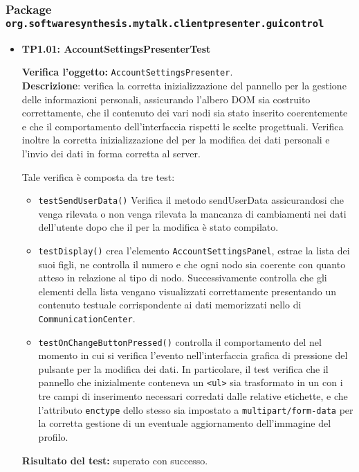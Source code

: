 \subsubsection{Package \texttt{org.softwaresynthesis.mytalk.clientpresenter.guicontrol}}

\begin{itemize}
\item \textbf{TP1.01: AccountSettingsPresenterTest}

\textbf{Verifica l'oggetto:} \texttt{AccountSettingsPresenter}.\\
\textbf{Descrizione}: verifica la corretta inizializzazione del pannello per la gestione delle informazioni personali, assicurando l'albero DOM sia costruito correttamente, che il contenuto dei vari nodi sia stato inserito coerentemente e che il comportamento dell'interfaccia rispetti le scelte progettuali. Verifica inoltre la corretta inizializzazione del  per la modifica dei dati personali e l'invio dei dati in forma corretta al server.

Tale verifica è composta da tre test:
\begin{itemize}

\item \texttt{testSendUserData()} Verifica il metodo sendUserData assicurandosi che venga rilevata o non venga rilevata la mancanza di cambiamenti nei dati dell'utente dopo che il  per la modifica è stato compilato.

\item \texttt{testDisplay()} crea l'elemento \texttt{AccountSettingsPanel}, estrae la lista dei suoi figli, ne controlla il numero e che ogni nodo sia coerente con quanto atteso in relazione al tipo di nodo.
Successivamente controlla che gli elementi della lista vengano visualizzati correttamente presentando un contenuto testuale corrispondente ai dati memorizzati nello  di \texttt{CommunicationCenter}.

\item \texttt{testOnChangeButtonPressed()} controlla il comportamento del  nel momento in cui si verifica l'evento nell'interfaccia grafica di pressione del pulsante per la modifica dei dati. In particolare, il test verifica che il pannello che inizialmente conteneva un \verb'<ul>' sia trasformato in un  con i tre campi di inserimento necessari corredati dalle relative etichette, e che l'attributo \verb'enctype' dello stesso sia impostato a \verb'multipart/form-data' per la corretta gestione di un eventuale aggiornamento dell'immagine del profilo.
\end{itemize}
\textbf{Risultato del test:} superato con successo.


\end{itemize}
